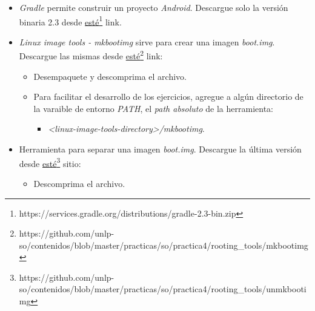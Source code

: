 \begin{itemize}
\begin{itemize}
      \item Para facilitar el desarrollo de los ejercicios, agregue las siguientes herramientas a la varaible de entorno \textit{PATH}:
      \begin{itemize}
  \item \textit{<android-sdk-directory>/platform-tools/adb}.
  \item \textit{<android-sdk-directory>/platform-tools/fastboot}.
  \item \textit{<android-sdk-directory>/platform-tools/sqlite3}.
  \item \textit{<android-sdk-directory>/tools/android}.
  \item \textit{<android-sdk-directory>/tools/emulator-x86}\footnote{Puede encontrarse con el nombre ``emulator''.}.
      \end{itemize}      
 \end{itemize}
 
 \item \textit{Gradle} permite construir un proyecto \emph{Android}. Descargue solo la versión binaria 2.3 desde \href{https://services.gradle.org/distributions/gradle-2.3-bin.zip}{esté}\footnote{https://services.gradle.org/distributions/gradle-2.3-bin.zip} link.

 \item \textit{Linux image tools - mkbootimg} sirve para crear una imagen \textit{boot.img}. Descargue las mismas desde \href{https://github.com/unlp-so/contenidos/blob/master/practicas/so/practica4/rooting\_tools/mkbootimg}{esté}\footnote{https://github.com/unlp-so/contenidos/blob/master/practicas/so/practica4/rooting\_tools/mkbootimg} link:
 \begin{itemize}
      \item Desempaquete y descomprima el archivo.

      \item Para facilitar el desarrollo de los ejercicios, agregue a algún directorio de la varaible de entorno \textit{PATH}, el \textit{path absoluto} de la herramienta:
      \begin{itemize}
  \item \textit{<linux-image-tools-directory>/mkbootimg}.
      \end{itemize}
 \end{itemize}
 
 \item Herramienta para separar una imagen \textit{boot.img}. Descargue la última versión desde \href{https://github.com/unlp-so/contenidos/blob/master/practicas/so/practica4/rooting\_tools/unmkbootimg}{esté}\footnote{https://github.com/unlp-so/contenidos/blob/master/practicas/so/practica4/rooting\_tools/unmkbootimg} sitio:
 \begin{itemize}
      \item Descomprima el archivo.


\end{itemize}
\end{itemize}
